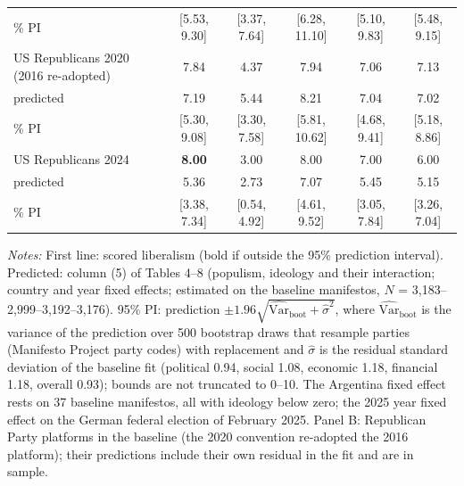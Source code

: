 \begin{table}[htbp]
\begin{tabular}{@{}lccccc@{}}
\quad 95\% PI & [5.53, 9.30] & [3.37, 7.64] & [6.28, 11.10] & [5.10, 9.83] & [5.48, 9.15] \\[2pt]
US Republicans 2020 (2016 re-adopted) & 7.84 & 4.37 & 7.94 & 7.06 & 7.13 \\
\quad predicted & 7.19 & 5.44 & 8.21 & 7.04 & 7.02 \\
\quad 95\% PI & [5.30, 9.08] & [3.30, 7.58] & [5.81, 10.62] & [4.68, 9.41] & [5.18, 8.86] \\[2pt]
US Republicans 2024 & \textbf{8.00} & 3.00 & 8.00 & 7.00 & 6.00 \\
\quad predicted & 5.36 & 2.73 & 7.07 & 5.45 & 5.15 \\
\quad 95\% PI & [3.38, 7.34] & [0.54, 4.92] & [4.61, 9.52] & [3.05, 7.84] & [3.26, 7.04] \\[2pt]
\bottomrule\end{tabular}
\begin{minipage}{0.95\textwidth}\vspace{2pt}\scriptsize\textit{Notes:} First line: scored liberalism (bold if outside the 95\% prediction interval). Predicted: column (5) of Tables 4--8 (populism, ideology and their interaction; country and year fixed effects; estimated on the baseline manifestos, $N$ = 3,183--2,999--3,192--3,176). 95\% PI: prediction $\pm 1.96\sqrt{\widehat{\mathrm{Var}}_{\mathrm{boot}} + \hat\sigma^2}$, where $\widehat{\mathrm{Var}}_{\mathrm{boot}}$ is the variance of the prediction over 500 bootstrap draws that resample parties (Manifesto Project party codes) with replacement and $\hat\sigma$ is the residual standard deviation of the baseline fit (political 0.94, social 1.08, economic 1.18, financial 1.18, overall 0.93); bounds are not truncated to 0--10. The Argentina fixed effect rests on 37 baseline manifestos, all with ideology below zero; the 2025 year fixed effect on the German federal election of February 2025. Panel B: Republican Party platforms in the baseline (the 2020 convention re-adopted the 2016 platform); their predictions include their own residual in the fit and are in sample.\end{minipage}
\end{table}
